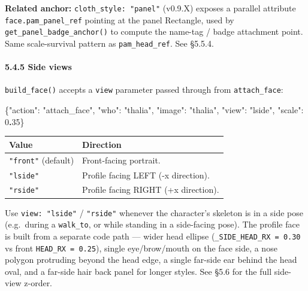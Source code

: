 \documentclass[
  12pt,
  letterpaper,
]{book}
\newenvironment{Shaded}{}{}
\newcommand{\DataTypeTok}[1]{\textcolor[rgb]{0.56,0.13,0.00}{#1}}
\newcommand{\DecValTok}[1]{\textcolor[rgb]{0.25,0.63,0.44}{#1}}
\newcommand{\ErrorTok}[1]{\textcolor[rgb]{1.00,0.00,0.00}{\textbf{#1}}}
\newcommand{\FunctionTok}[1]{\textcolor[rgb]{0.02,0.16,0.49}{#1}}
\newcommand{\StringTok}[1]{\textcolor[rgb]{0.25,0.44,0.63}{#1}}
\begin{document}
\textbf{Related anchor:} \texttt{cloth\_style:\ "panel"} (v0.9.X)
exposes a parallel attribute \texttt{face.pam\_panel\_ref} pointing at
the panel Rectangle, used by \texttt{get\_panel\_badge\_anchor()} to
compute the name-tag / badge attachment point. Same scale-survival
pattern as \texttt{pam\_head\_ref}. See §5.5.4.

\paragraph{5.4.5 Side views}\label{side-views}

\texttt{build\_face()} accepts a \texttt{view} parameter passed through
from \texttt{attach\_face}:

\begin{Shaded}
\begin{Highlighting}[]
\FunctionTok{\{}\DataTypeTok{"action"}\FunctionTok{:} \StringTok{"attach\_face"}\FunctionTok{,} \DataTypeTok{"who"}\FunctionTok{:} \StringTok{"thalia"}\FunctionTok{,}
 \DataTypeTok{"image"}\FunctionTok{:} \StringTok{"thalia"}\FunctionTok{,} \DataTypeTok{"view"}\FunctionTok{:} \StringTok{"lside"}\FunctionTok{,} \DataTypeTok{"scale"}\FunctionTok{:} \DecValTok{0}\ErrorTok{.}\DecValTok{35}\FunctionTok{\}}
\end{Highlighting}
\end{Shaded}

\begin{longtable}[]{@{}ll@{}}
\toprule\noalign{}
Value & Direction \\
\midrule\noalign{}
\endhead
\bottomrule\noalign{}
\endlastfoot
\texttt{"front"} (default) & Front-facing portrait. \\
\texttt{"lside"} & Profile facing LEFT (-x direction). \\
\texttt{"rside"} & Profile facing RIGHT (+x direction). \\
\end{longtable}

Use \texttt{view:\ "lside"} / \texttt{"rside"} whenever the character's
skeleton is in a side pose (e.g.~during a \texttt{walk\_to}, or while
standing in a side-facing pose). The profile face is built from a
separate code path --- wider head ellipse
(\texttt{\_SIDE\_HEAD\_RX\ =\ 0.30} vs front
\texttt{HEAD\_RX\ =\ 0.25}), single eye/brow/mouth on the face side, a
nose polygon protruding beyond the head edge, a single far-side ear
behind the head oval, and a far-side hair back panel for longer styles.
See §5.6 for the full side-view z-order.
\end{document}
